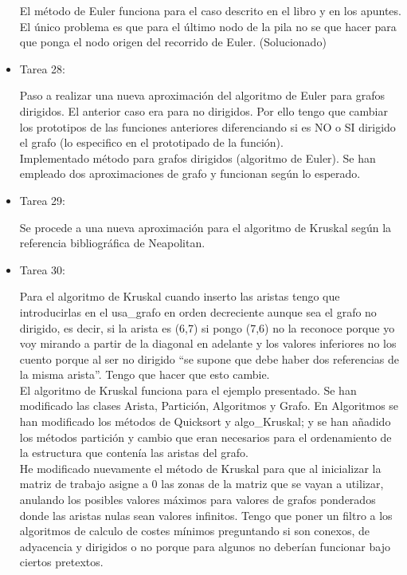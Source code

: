 \begin{itemize}
El método de Euler funciona para el caso descrito en el libro y en los apuntes. El único problema es que para el último nodo de la pila no se que hacer para que ponga el nodo origen del recorrido de Euler. (Solucionado)\\

\item Tarea 28:

Paso a realizar una nueva aproximación del algoritmo de Euler para grafos dirigidos. El anterior caso era para no dirigidos. Por ello tengo que cambiar los prototipos de las funciones anteriores diferenciando si es NO o SI dirigido el grafo (lo especifico en el prototipado de la función).\\

Implementado método para grafos dirigidos (algoritmo de Euler). Se han empleado dos aproximaciones de grafo y funcionan según lo esperado.\\

\item Tarea 29:

Se procede a una nueva aproximación para el algoritmo de Kruskal según la referencia bibliográfica de Neapolitan.\\

\item Tarea 30:

Para el algoritmo de Kruskal cuando inserto las aristas tengo que introducirlas en el usa\_grafo en orden decreciente aunque sea el grafo no dirigido, es decir, si la arista es (6,7) si pongo (7,6) no la reconoce porque yo voy mirando a partir de la diagonal en adelante y los valores inferiores no los cuento porque al ser no dirigido ``se supone que debe haber dos referencias de la misma arista''. Tengo que hacer que esto cambie.\\

El algoritmo de Kruskal funciona para el ejemplo presentado. Se han modificado las clases Arista, Partición, Algoritmos y Grafo. En Algoritmos se han modificado los métodos de Quicksort y algo\_Kruskal; y se han añadido los métodos partición y cambio que eran necesarios para el ordenamiento de la estructura que contenía las aristas del grafo.\\

He modificado nuevamente el método de Kruskal para que al inicializar la matriz de trabajo asigne a 0 las zonas de la matriz que se vayan a utilizar, anulando los posibles valores máximos para valores de grafos ponderados donde las aristas nulas sean valores infinitos. Tengo que poner un filtro a los algoritmos de calculo de costes mínimos preguntando si son conexos, de adyacencia y dirigidos o no porque para algunos no deberían funcionar bajo ciertos pretextos.\\


\end{itemize}
